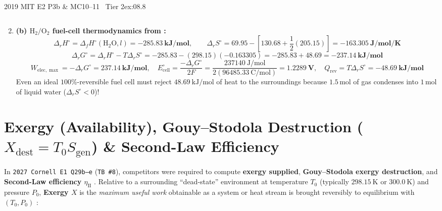 \begin{workedexample}{2019 MIT E2 P3b \& MC10--11 \textbar\ Tier 2}{ex:08.8}
\begin{enumerate}
\begin{itemize}
\[    \]
  \end{itemize}
  \item \textbf{(b) $\mathrm{H_2/O_2}$ fuel-cell thermodynamics from :}
  \[
    \Delta_r H^\circ = \Delta_f H^\circ(\mathrm{H_2O},l) = \mathbf{\SI{-285.83}{\kilo\joule\per\mole}}, \qquad \Delta_r S^\circ = 69.95 - \left[130.68 + \frac{1}{2}(205.15)\right] = \mathbf{\SI{-163.305}{\joule\per\mole\per\kelvin}}
  \]
  \[
    \Delta_r G^\circ = \Delta_r H^\circ - T\Delta_r S^\circ = -285.83 - (298.15)(-0.163305) = -285.83 + 48.69 = \mathbf{\SI{-237.14}{\kilo\joule\per\mole}}
  \]
  \[
    W_{\mathrm{elec,\max}} = -\Delta_r G^\circ = \mathbf{\SI{237.14}{\kilo\joule\per\mole}}, \quad E_{\mathrm{cell}}^\circ = \frac{-\Delta_r G^\circ}{2F} = \frac{\SI{237140}{\joule\per\mole}}{2(\SI{96485.33}{\coulomb\per\mole})} = \mathbf{\SI{1.2289}{\volt}}, \quad Q_{\mathrm{rev}} = T\Delta_r S^\circ = \mathbf{\SI{-48.69}{\kilo\joule\per\mole}}
  \]
  Even an ideal $100\%$-reversible fuel cell must reject $\SI{48.69}{\kilo\joule\per\mole}$ of heat to the surroundings because $1.5\,\si{\mole}$ of gas condenses into $1\,\si{\mole}$ of liquid water ($\Delta_r S^\circ < 0$)!
\end{enumerate}
\end{workedexample}

\section{Exergy (Availability), Gouy--Stodola Destruction ($X_{\mathrm{dest}} = T_0 S_{\mathrm{gen}}$) \& Second-Law Efficiency}\label{sec:08.6}

In \texttt{2027 Cornell E1 Q29b--e} (\texttt{TB~\#8}), competitors were required to compute \textbf{exergy supplied}, \textbf{Gouy--Stodola exergy destruction}, and \textbf{Second-Law efficiency $\eta_{\mathrm{II}}$} . Relative to a surrounding ``dead-state'' environment at temperature $T_0$ (typically $\SI{298.15}{\kelvin}$ or $\SI{300.0}{\kelvin}$) and pressure $P_0$, \textbf{Exergy $X$} is the \emph{maximum useful work} obtainable as a system or heat stream is brought reversibly to equilibrium with $(T_0, P_0)$ :

